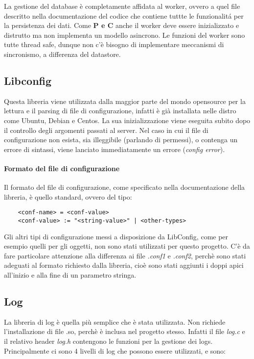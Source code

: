 \documentclass[]{article}
\begin{document}
La gestione del database \`e completamente affidata al worker, ovvero a quel file descritto nella documentazione
del codice che contiene tuttte le funzionalit\'a per la persistenza dei dati.
Come \textbf{P e C} anche il worker deve essere inizializzato e distrutto ma non implementa un modello asincrono.
Le funzioni del worker sono tutte thread safe, dunque non c'\`e bisogno di implementare meccanismi di sincronismo, a
differenza del datastore.

\subsection{Libconfig}
Questa libreria viene utilizzata dalla maggior parte del mondo opensource per la lettura e il parsing di file
di configurazione, infatti \`e gi\`a installata nelle distro come Ubuntu, Debian e Centos.
La sua inizializzazione viene eseguita subito dopo il controllo degli argomenti passati al server.
Nel caso in cui il file di configurazione non esista, sia illeggibile (parlando di permessi), o contenga
un errore di sintassi, viene lanciato immediatamente un errore (\textit{config error}).

\paragraph{Formato del file di configurazione}
Il formato del file di configurazione, come specificato nella documentazione della libreria, \`e quello standard,
ovvero del tipo:
\begin{lstlisting}
	<conf-name> = <conf-value>
	<conf-value> := "<string-value>" | <other-types>
\end{lstlisting}
Gli altri tipi di configurazione messi a disposizione da LibConfig, come per esempio quelli per gli oggetti,
non sono stati utilizzati per questo progetto.
C'\`e da fare particolare attenzione alla differenza ai file \textit{.conf1} e \textit{.conf2}, perch\`e sono stati
adeguati al formato richiesto dalla libreria, cio\`e sono stati aggiunti i doppi apici all'inizio e alla fine di un
parametro stringa.

\subsection{Log}
La libreria di log \`e quella pi\`u semplice che \`e stata utilizzata. Non richiede l'installazione di file .so,
perch\`e \`e inclusa nel progetto stesso. Infatti il file \textit{log.c} e il relativo header \textit{log.h} contengono
le funzioni per la gestione dei logs.
Principalmente ci sono 4 livelli di log che possono essere utilizzati, e sono:
\end{document}
